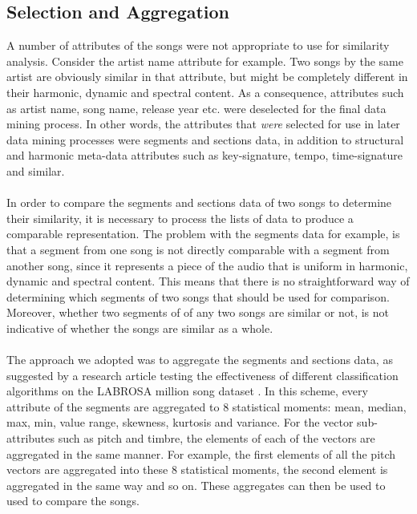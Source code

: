 \subsection{Selection and Aggregation}
\label{sec:preprocessing_selection}
A number of attributes of the songs were not appropriate to use for similarity analysis. Consider the artist name attribute for example. Two songs by the same artist are obviously similar in that attribute, but might be completely different in their harmonic, dynamic and spectral content. As a consequence, attributes such as artist name, song name, release year etc. were deselected for the final data mining process. In other words, the attributes that \textit{were} selected for use in later data mining processes were segments and sections data, in addition to structural and harmonic meta-data attributes such as key-signature, tempo, time-signature and similar.
\\\\
In order to compare the segments and sections data of two songs to determine their similarity, it is necessary to process the lists of data to produce a comparable representation. The problem with the segments data for example, is that a segment from one song is not directly comparable with a segment from another song, since it represents a piece of the audio that is uniform in harmonic, dynamic and spectral content. This means that there is no straightforward way of determining which segments of two songs that should be used for comparison. Moreover, whether two segments of of any two songs are similar or not, is not indicative of whether the songs are similar as a whole.
\\\\
The approach we adopted was to aggregate the segments and sections data, as suggested by a research article testing the effectiveness of different classification algorithms on the LABROSA million song dataset \citep{schindler12}. In this scheme, every attribute of the segments are aggregated to 8 statistical moments: mean, median, max, min, value range, skewness, kurtosis and variance. For the vector sub-attributes such as pitch and timbre, the elements of each of the vectors are aggregated in the same manner. For example, the first elements of all the pitch vectors are aggregated into these 8 statistical moments, the second element is aggregated in the same way and so on. These aggregates can then be used to used to compare the songs.

